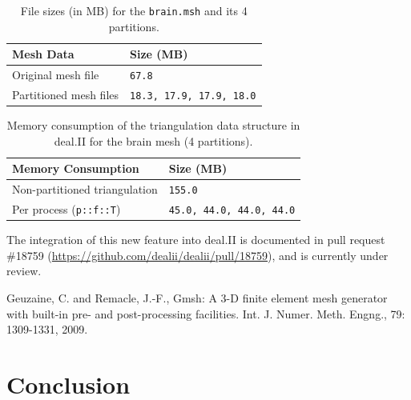 \documentclass[a4paper,12pt]{article}
\begin{document}
\begin{table}[h!]
    \centering
    \begin{tabular}{@{}ll@{}}
        \toprule
        \textbf{Mesh Data}     & \textbf{Size (MB)}              \\ \midrule
        Original mesh file     & \texttt{67.8}                   \\
        Partitioned mesh files & \texttt{18.3, 17.9, 17.9, 18.0} \\
        \bottomrule
    \end{tabular}
    \caption{File sizes (in MB) for the \texttt{brain.msh} and its 4 partitions.}
    \label{tab:mesh-sizes}
\end{table}

\begin{table}[h!]
    \centering
    \begin{tabular}{@{}ll@{}}
        \toprule
        \textbf{Memory Consumption}    & \textbf{Size (MB)}              \\ \midrule
        Non-partitioned triangulation  & \texttt{155.0}                  \\
        Per process (\texttt{p::f::T}) & \texttt{45.0, 44.0, 44.0, 44.0} \\
        \bottomrule
    \end{tabular}
    \caption{Memory consumption of the triangulation data structure in deal.II for the brain mesh (4 partitions).}
    \label{tab:memory-consumption}
\end{table}


The integration of this new feature into deal.II is documented in
pull request \#18759 (\url{https://github.com/dealii/dealii/pull/18759}), and is
currently under review.

\begin{thebibliography}{10}
     Geuzaine, C. and Remacle, J.-F., Gmsh: A 3-D finite element mesh generator with built-in pre- and post-processing facilities. Int. J. Numer. Meth. Engng., 79: 1309-1331, 2009.
\end{thebibliography}


\newpage

\section{{Conclusion}} \label{sec:conclusion}

\lipsum[20]

\label{MyLastPage}
\end{document}
